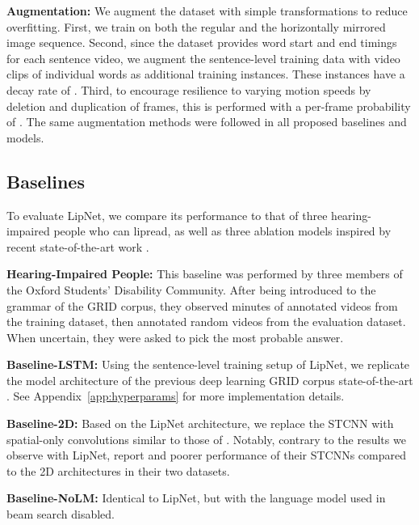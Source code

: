 \documentclass{article}
\newcommand{\minisec}[1]{\textbf{#1:}}
\begin{document}
\minisec{Augmentation} We augment the dataset with simple transformations to reduce overfitting. First, we train on both the regular and the horizontally mirrored image sequence. Second, since the dataset provides word start and end timings for each sentence video, we augment the sentence-level training data with video clips of individual words as additional training instances. These instances have a decay rate of . Third, to encourage resilience to varying motion speeds by deletion and duplication of frames, this is performed with a per-frame probability of . The same augmentation methods were followed in all proposed baselines and models.



\subsection{Baselines}

To evaluate LipNet, we compare its performance to that of three hearing-impaired people who can lipread, as well as three ablation models inspired by recent state-of-the-art work \citep{chung2016lip,wand2016lipreading}.

\minisec{Hearing-Impaired People} This baseline was performed by three members of the Oxford Students' Disability Community. After being introduced to the grammar of the GRID corpus, they observed  minutes of annotated videos from the training dataset, then annotated  random videos from the evaluation dataset. When uncertain, they were asked to pick the most probable answer.

\minisec{Baseline-LSTM} Using the sentence-level training setup of LipNet, we replicate the model architecture of the previous deep learning GRID corpus state-of-the-art \citep{wand2016lipreading}. See Appendix~\ref{app:hyperparams} for more implementation details.

\minisec{Baseline-2D} Based on the LipNet architecture, we replace the STCNN with spatial-only convolutions similar to those of \cite{chung2016lip}. Notably, contrary to the results we observe with LipNet, \cite{chung2016lip} report  and  poorer performance of their STCNNs compared to the 2D architectures in their two datasets.

\minisec{Baseline-NoLM} Identical to LipNet, but with the language model used in beam search disabled.
\end{document}
